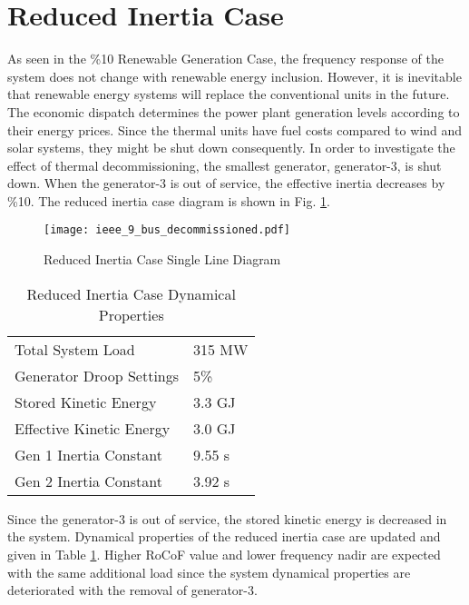 \section{Reduced Inertia Case}
\label{sec:kdecommissioned}
As seen in the \%10 Renewable Generation Case, the frequency response of the system does not change with renewable energy inclusion. However, it is inevitable that renewable energy systems will replace the conventional units in the future. The economic dispatch determines the power plant generation levels according to their energy prices. Since the thermal units have fuel costs compared to wind and solar systems, they might be shut down consequently. In order to investigate the effect of thermal decommissioning, the smallest generator, generator-3, is shut down. When the generator-3 is out of service, the effective inertia decreases by \%10. The reduced inertia case diagram is shown in Fig. \ref{decommissioned_case}.\par
\begin{figure}[h!]
	\centering
	\texttt{[image: ieee\_9\_bus\_decommissioned.pdf]}
	\caption{Reduced Inertia Case Single Line Diagram}
	\label{decommissioned_case}
\end{figure}
\begin{table}[h]
	\centering
	\begin{tabular}{ll}
		\hline
		Total System Load                      & 315 MW    \\
		Generator Droop Settings               & 5\%       \\
		Stored Kinetic Energy 				   & 3.3 GJ \\
		Effective Kinetic Energy 			   & 3.0 GJ \\
		Gen 1 Inertia Constant                 & 9.55 s  \\
		Gen 2 Inertia Constant                 & 3.92 s  \\
		\hline
	\end{tabular}
	\caption{Reduced Inertia Case Dynamical Properties}
	\label{systemdynamicaldatacase3}
\end{table}
Since the generator-3 is out of service, the stored kinetic energy is decreased in the system. Dynamical properties of the reduced inertia case are updated and given in Table \ref{systemdynamicaldatacase3}. Higher RoCoF value and lower frequency nadir are expected with the same additional load since the system dynamical properties are deteriorated with the removal of generator-3.
